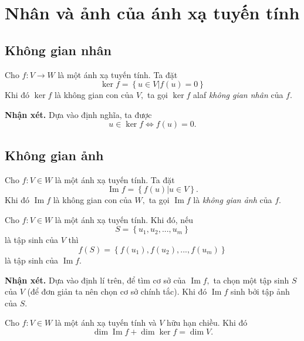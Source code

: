 \section{Nhân và ảnh của ánh xạ tuyến tính}
\subsection{Không gian nhân}
Cho $f: V \to W$ là một ánh xạ tuyến tính. Ta đặt
$$\ker f = \left\{ {u \in \left. V \right|f\left( u \right) = 0} \right\}$$
Khi đó $\ker f$ là không gian con của $V,$ ta gọi $\ker f$ alaf \textit{không gian nhân} của $f.$
\begin{mybox}
\textbf{Nhận xét.} Dựa vào định nghĩa, ta được
$$u \in \ker f \Leftrightarrow f \left( u \right) = 0.$$
\end{mybox}
\subsection{Không gian ảnh}
Cho $f: V \in W$ là một ánh xạ tuyến tính. Ta đặt
$$\operatorname{Im} f = \left\{ {\left. {f\left( u \right)} \right|u \in V} \right\}.$$
Khi đó $\operatorname{Im} f$ là không gian con của $W,$ ta gọi $\operatorname{Im} f$ là \textit{không gian ảnh} của $f.$
\begin{mybox}
\begin{theorem}
Cho $f: V \in W$ là một ánh xạ tuyến tính. Khi đó, nếu
$$S = \left\{ {{u_1},{u_2},...,{u_m}} \right\}$$ 
là tập sinh của $V$ thì
$$f\left( S \right) = \left\{ {f\left( {{u_1}} \right),f\left( {{u_2}} \right),...,f\left( {{u_m}} \right)} \right\}$$
là tập sinh của $\operatorname{Im} f.$
\end{theorem}
\end{mybox}
\begin{mybox}
\textbf{Nhận xét.} Dựa vào định lí trên, để tìm cơ sở của $\operatorname{Im} f,$ ta chọn một tập sinh $S$ của $V$ (để đơn giản ta nên chọn cơ sở chính tắc). Khi đó $\operatorname{Im} f$ sinh bởi tập ảnh của $S.$
\end{mybox}
\begin{mybox}
\begin{theorem}
Cho $f: V \in W$ là một ánh xạ tuyến tính và $V$ hữu hạn chiều. Khi đó
$$\dim \operatorname{Im} f + \dim \ker f = \dim V.$$
\end{theorem}
\end{mybox}
